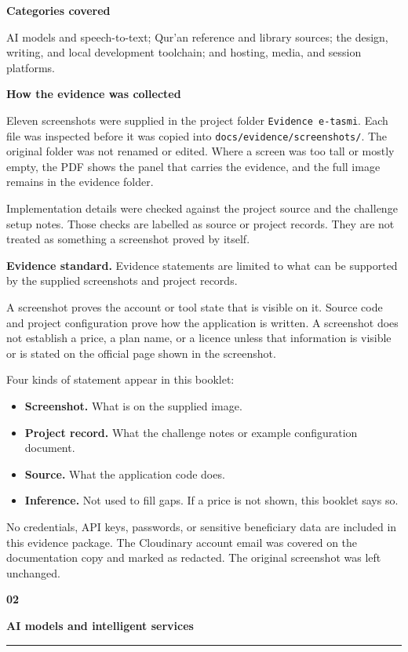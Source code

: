\documentclass[10.5pt]{article}
\newcommand{\secno}[2]{%
  {\sffamily\bfseries\fontsize{10}{12}\selectfont\color{teal}#1}\par\vspace{0.4mm}%
  {\sffamily\bfseries\fontsize{15.5}{18}\selectfont\color{navy}#2}\par\vspace{1mm}%
  {\color{teal}\rule{\textwidth}{0.7pt}}\par\vspace{1.6mm}%
}
\newcommand{\evbox}[1]{%
  \vspace{0.6mm}\noindent\colorbox{tealsoft}{%
    \begin{minipage}{\dimexpr\textwidth-2\fboxsep\relax}
      \fontsize{9.5}{12.4}\selectfont #1
    \end{minipage}}\par\vspace{0.8mm}%
}
\newcommand{\hlabel}[1]{{\sffamily\bfseries\color{navy}#1}}
\begin{document}
\hlabel{Categories covered}\par
AI models and speech-to-text; Qur'an reference and library sources; the design, writing, and local development toolchain; and hosting, media, and session platforms.

\hlabel{How the evidence was collected}\par
Eleven screenshots were supplied in the project folder \texttt{Evidence e-tasmi}. Each file was inspected before it was copied into \texttt{docs/evidence/screenshots/}. The original folder was not renamed or edited. Where a screen was too tall or mostly empty, the PDF shows the panel that carries the evidence, and the full image remains in the evidence folder.

Implementation details were checked against the project source and the challenge setup notes. Those checks are labelled as source or project records. They are not treated as something a screenshot proved by itself.

\evbox{%
\textbf{Evidence standard.} Evidence statements are limited to what can be supported by the supplied screenshots and project records.\par\vspace{0.7mm}
A screenshot proves the account or tool state that is visible on it. Source code and project configuration prove how the application is written. A screenshot does not establish a price, a plan name, or a licence unless that information is visible or is stated on the official page shown in the screenshot.}

Four kinds of statement appear in this booklet:
\begin{itemize}
  \item \textbf{Screenshot.} What is on the supplied image.
  \item \textbf{Project record.} What the challenge notes or example configuration document.
  \item \textbf{Source.} What the application code does.
  \item \textbf{Inference.} Not used to fill gaps. If a price is not shown, this booklet says so.
\end{itemize}

No credentials, API keys, passwords, or sensitive beneficiary data are included in this evidence package. The Cloudinary account email was covered on the documentation copy and marked as redacted. The original screenshot was left unchanged.

\clearpage
\secno{02}{AI models and intelligent services}
\end{document}
